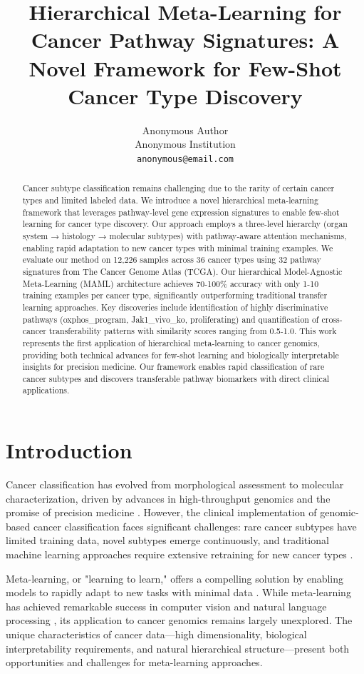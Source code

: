 \documentclass{article}
\title{Hierarchical Meta-Learning for Cancer Pathway Signatures: A Novel Framework for Few-Shot Cancer Type Discovery}
\author{%
  Anonymous Author \\
  Anonymous Institution \\
  \texttt{anonymous@email.com} \\
}
\begin{document}
\maketitle

\begin{abstract}
Cancer subtype classification remains challenging due to the rarity of certain cancer types and limited labeled data. We introduce a novel hierarchical meta-learning framework that leverages pathway-level gene expression signatures to enable few-shot learning for cancer type discovery. Our approach employs a three-level hierarchy (organ system → histology → molecular subtypes) with pathway-aware attention mechanisms, enabling rapid adaptation to new cancer types with minimal training examples. We evaluate our method on 12,226 samples across 36 cancer types using 32 pathway signatures from The Cancer Genome Atlas (TCGA). Our hierarchical Model-Agnostic Meta-Learning (MAML) architecture achieves 70-100\% accuracy with only 1-10 training examples per cancer type, significantly outperforming traditional transfer learning approaches. Key discoveries include identification of highly discriminative pathways (oxphos\_program, Jak1\_vivo\_ko, proliferating) and quantification of cross-cancer transferability patterns with similarity scores ranging from 0.5-1.0. This work represents the first application of hierarchical meta-learning to cancer genomics, providing both technical advances for few-shot learning and biologically interpretable insights for precision medicine. Our framework enables rapid classification of rare cancer subtypes and discovers transferable pathway biomarkers with direct clinical applications.
\end{abstract}

\section{Introduction}

Cancer classification has evolved from morphological assessment to molecular characterization, driven by advances in high-throughput genomics and the promise of precision medicine \cite{weinstein2013cancer}. However, the clinical implementation of genomic-based cancer classification faces significant challenges: rare cancer subtypes have limited training data, novel subtypes emerge continuously, and traditional machine learning approaches require extensive retraining for new cancer types \cite{bailey2018comprehensive}.

Meta-learning, or "learning to learn," offers a compelling solution by enabling models to rapidly adapt to new tasks with minimal data \cite{finn2017model}. While meta-learning has achieved remarkable success in computer vision and natural language processing \cite{hospedales2021meta}, its application to cancer genomics remains largely unexplored. The unique characteristics of cancer data—high dimensionality, biological interpretability requirements, and natural hierarchical structure—present both opportunities and challenges for meta-learning approaches.
\end{document}
